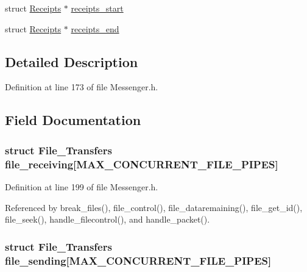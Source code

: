 \begin{DoxyCompactItemize}
\begin{tabbing}
\end{tabbing}\item 
struct \hyperlink{struct_receipts}{Receipts} $\ast$ \hyperlink{struct_friend_a49fea7d214384bfdb887ce868fef0e93}{receipts\+\_\+start}
\item 
struct \hyperlink{struct_receipts}{Receipts} $\ast$ \hyperlink{struct_friend_ad4ff64ea096ee2af6b53f8d9f7901776}{receipts\+\_\+end}
\end{DoxyCompactItemize}


\subsection{Detailed Description}


Definition at line 173 of file Messenger.\+h.



\subsection{Field Documentation}
\hypertarget{struct_friend_ab14e1c3452717012d0bbb0dad068e9f6}{
\subsubsection[{file\+\_\+receiving}]{\setlength{\rightskip}{0pt plus 5cm}struct {\bf File\+\_\+\+Transfers} file\+\_\+receiving\mbox{[}{\bf M\+A\+X\+\_\+\+C\+O\+N\+C\+U\+R\+R\+E\+N\+T\+\_\+\+F\+I\+L\+E\+\_\+\+P\+I\+P\+E\+S}\mbox{]}}}\label{struct_friend_ab14e1c3452717012d0bbb0dad068e9f6}


Definition at line 199 of file Messenger.\+h.



Referenced by break\+\_\+files(), file\+\_\+control(), file\+\_\+dataremaining(), file\+\_\+get\+\_\+id(), file\+\_\+seek(), handle\+\_\+filecontrol(), and handle\+\_\+packet().

\hypertarget{struct_friend_a51d0849a59878ad9e4b67123a1c87037}{
\subsubsection[{file\+\_\+sending}]{\setlength{\rightskip}{0pt plus 5cm}struct {\bf File\+\_\+\+Transfers} file\+\_\+sending\mbox{[}{\bf M\+A\+X\+\_\+\+C\+O\+N\+C\+U\+R\+R\+E\+N\+T\+\_\+\+F\+I\+L\+E\+\_\+\+P\+I\+P\+E\+S}\mbox{]}}}\label{struct_friend_a51d0849a59878ad9e4b67123a1c87037}


